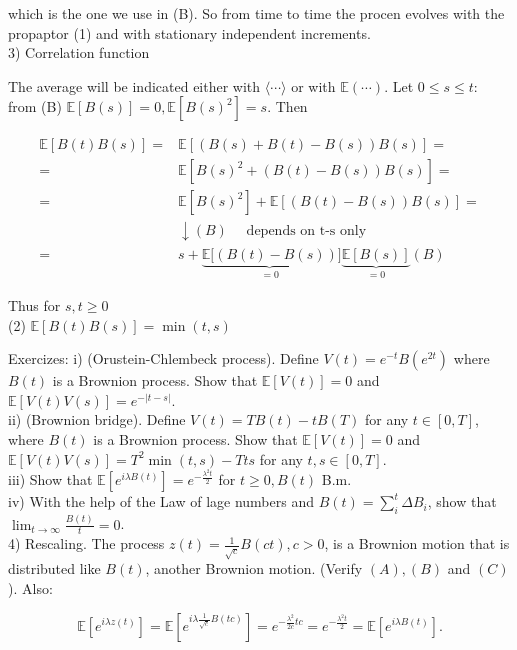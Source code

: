 \documentclass[10pt]{article}
\begin{document}
which is the one we use in (B). So from time to time the procen evolves with the propaptor (1) and with stationary independent increments.\\
3) Correlation function

The average will be indicated either with $\langle\cdots\rangle$ or with $\mathbb{E}(\cdots)$. Let $0 \leqslant s \leqslant t:$ from (B) $\mathbb{E}[B(s)]=0, \mathbb{E}\left[B(s)^{2}\right]=s$. Then

$$
\begin{aligned}
\mathbb{E}[B(t) B(s)]= & \mathbb{E}[(B(s)+B(t)-B(s)) B(s)]= \\
= & \mathbb{E}\left[B(s)^{2}+(B(t)-B(s)) B(s)\right]= \\
= & \mathbb{E}\left[B(s)^{2}\right]+\mathbb{E}[(B(t)-B(s)) B(s)]= \\
& \downarrow(B) \quad \text { depends on t-s only } \\
= & s+\underbrace{\mathbb{E}[(B(t)-B(s))}_{=0}] \underbrace{\mathbb{E}[B(s)]}_{=0}(B)
\end{aligned}
$$

Thus for $s, t \geqslant 0$\\
(2) $\mathbb{E}[B(t) B(s)]=\min (t, s)$

Exercizes: i) (Orustein-Chlembeck process). Define $V(t)=e^{-t} B\left(e^{2 t}\right)$ where $B(t)$ is a Brownion process. Show that $\mathbb{E}[V(t)]=0$ and $\mathbb{E}[V(t) V(s)]=e^{-|t-s|}$.\\
ii) (Brownion bridge). Define $V(t)=T B(t)-t B(T)$ for any $t \in[0, T]$, where $B(t)$ is a Brownion process. Show that $\mathbb{E}[V(t)]=0$ and $\mathbb{E}[V(t) V(s)]=T^{2} \min (t, s)-T t s$ for any $t, s \in[0, T]$.\\
iii) Show that $\mathbb{E}\left[e^{i \lambda B(t)}\right]=e^{-\frac{\lambda^{2} t}{2}}$ for $t \geqslant 0, B(t)$ B.m.\\
iv) With the help of the Law of lage numbers and $B(t)=\sum_{i}^{t} \Delta B_{i}$, show that $\lim _{t \rightarrow \infty} \frac{B(t)}{t}=0$.\\
4) Rescaling. The process $z(t)=\frac{1}{\sqrt{c}} B(c t), c>0$, is a Brownion motion that is distributed like $B(t)$, another Brownion motion. (Verify $(A),(B)$ and $(C)$ ). Also:

$$
\mathbb{E}\left[e^{i \lambda z(t)}\right]=\mathbb{E}\left[e^{i \lambda \frac{1}{\sqrt{c}} B(t c)}\right]=e^{-\frac{\lambda^{2}}{2 c} t c}=e^{-\frac{\lambda^{2} t}{2}}=\mathbb{E}\left[e^{i \lambda B(t)}\right] .
$$
\end{document}
